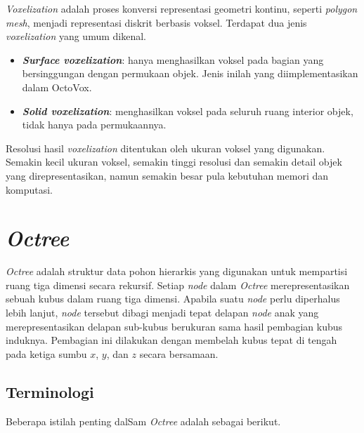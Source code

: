 \textit{Voxelization} adalah proses konversi representasi geometri kontinu, seperti
\textit{polygon mesh}, menjadi representasi diskrit berbasis voksel. Terdapat dua
jenis \textit{voxelization} yang umum dikenal.

\begin{itemize}
    \item \textbf{\textit{Surface voxelization}}: hanya menghasilkan voksel pada
          bagian yang bersinggungan dengan permukaan objek. Jenis inilah yang
          diimplementasikan dalam OctoVox.

    \item \textbf{\textit{Solid voxelization}}: menghasilkan voksel pada seluruh
          ruang interior objek, tidak hanya pada permukaannya.
\end{itemize}

Resolusi hasil \textit{voxelization} ditentukan oleh ukuran voksel yang digunakan.
Semakin kecil ukuran voksel, semakin tinggi resolusi dan semakin detail objek yang
direpresentasikan, namun semakin besar pula kebutuhan memori dan komputasi.

\section{\textit{Octree}}

\textit{Octree} adalah struktur data pohon hierarkis yang digunakan untuk
mempartisi ruang tiga dimensi secara rekursif. Setiap \textit{node} dalam
\textit{Octree} merepresentasikan sebuah kubus dalam ruang tiga dimensi. Apabila
suatu \textit{node} perlu diperhalus lebih lanjut, \textit{node} tersebut dibagi
menjadi tepat delapan \textit{node} anak yang merepresentasikan delapan sub-kubus
berukuran sama hasil pembagian kubus induknya. Pembagian ini dilakukan dengan
membelah kubus tepat di tengah pada ketiga sumbu $x$, $y$, dan $z$ secara
bersamaan.

\subsection{Terminologi}

Beberapa istilah penting dalSam \textit{Octree} adalah sebagai berikut.

